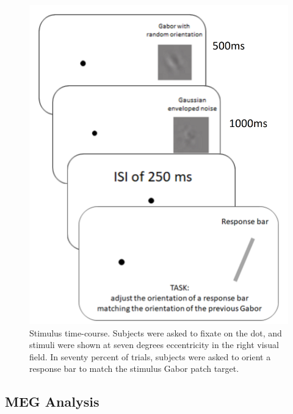 \documentclass[../main.tex]{subfiles}
\begin{document}
\begin{figure}
    \centering
    \includegraphics[scale=0.22]{figures/methods/Experimental Task.png}
    \caption{Stimulus time-course. Subjects were asked to fixate on the dot, and stimuli were shown at seven degrees eccentricity in the right visual field. In seventy percent of trials, subjects were asked to orient a response bar to match the stimulus Gabor patch target.}
    \label{stim_course}
\end{figure}

\subsection{MEG Analysis}
\end{document}
